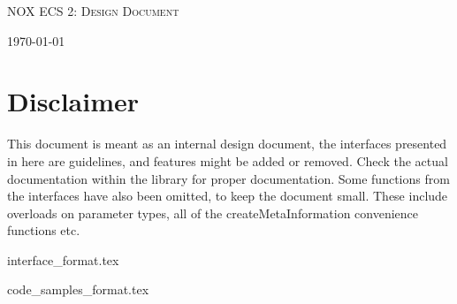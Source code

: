 \documentclass[hidelinks]{article}
\begin{document}
\begin{titlepage}
    \centering
    {\scshape\LARGE NOX ECS 2: Design Document \par}
    \vfill
    {\large \today\par}
\end{titlepage}

\tableofcontents
\pagebreak

\section{Disclaimer}
This document is meant as an internal design document,
the interfaces presented in here are guidelines, and features might be added or removed.
Check the actual documentation within the library for proper documentation.
Some functions from the interfaces have also been omitted, to keep the document small. 
These include overloads on parameter types, all of the createMetaInformation convenience functions etc.

{interface_format.tex}

\pagebreak



\pagebreak
{code_samples_format.tex}
\end{document}
